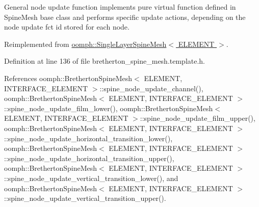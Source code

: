 General node update function implements pure virtual function defined in Spine\+Mesh base class and performs specific update actions, depending on the node update fct id stored for each node. 



Reimplemented from \hyperlink{classoomph_1_1SingleLayerSpineMesh_a364648c15ab29c0c8d1cf7c2bc4cb792}{oomph\+::\+Single\+Layer\+Spine\+Mesh$<$ E\+L\+E\+M\+E\+N\+T $>$}.



Definition at line 136 of file bretherton\+\_\+spine\+\_\+mesh.\+template.\+h.



References oomph\+::\+Bretherton\+Spine\+Mesh$<$ E\+L\+E\+M\+E\+N\+T, I\+N\+T\+E\+R\+F\+A\+C\+E\+\_\+\+E\+L\+E\+M\+E\+N\+T $>$\+::spine\+\_\+node\+\_\+update\+\_\+channel(), oomph\+::\+Bretherton\+Spine\+Mesh$<$ E\+L\+E\+M\+E\+N\+T, I\+N\+T\+E\+R\+F\+A\+C\+E\+\_\+\+E\+L\+E\+M\+E\+N\+T $>$\+::spine\+\_\+node\+\_\+update\+\_\+film\+\_\+lower(), oomph\+::\+Bretherton\+Spine\+Mesh$<$ E\+L\+E\+M\+E\+N\+T, I\+N\+T\+E\+R\+F\+A\+C\+E\+\_\+\+E\+L\+E\+M\+E\+N\+T $>$\+::spine\+\_\+node\+\_\+update\+\_\+film\+\_\+upper(), oomph\+::\+Bretherton\+Spine\+Mesh$<$ E\+L\+E\+M\+E\+N\+T, I\+N\+T\+E\+R\+F\+A\+C\+E\+\_\+\+E\+L\+E\+M\+E\+N\+T $>$\+::spine\+\_\+node\+\_\+update\+\_\+horizontal\+\_\+transition\+\_\+lower(), oomph\+::\+Bretherton\+Spine\+Mesh$<$ E\+L\+E\+M\+E\+N\+T, I\+N\+T\+E\+R\+F\+A\+C\+E\+\_\+\+E\+L\+E\+M\+E\+N\+T $>$\+::spine\+\_\+node\+\_\+update\+\_\+horizontal\+\_\+transition\+\_\+upper(), oomph\+::\+Bretherton\+Spine\+Mesh$<$ E\+L\+E\+M\+E\+N\+T, I\+N\+T\+E\+R\+F\+A\+C\+E\+\_\+\+E\+L\+E\+M\+E\+N\+T $>$\+::spine\+\_\+node\+\_\+update\+\_\+vertical\+\_\+transition\+\_\+lower(), and oomph\+::\+Bretherton\+Spine\+Mesh$<$ E\+L\+E\+M\+E\+N\+T, I\+N\+T\+E\+R\+F\+A\+C\+E\+\_\+\+E\+L\+E\+M\+E\+N\+T $>$\+::spine\+\_\+node\+\_\+update\+\_\+vertical\+\_\+transition\+\_\+upper().

\mbox{\label{classoomph_1_1BrethertonSpineMesh_a5a09b6d2f5e7ffd12a0ae882754ad818}} 
